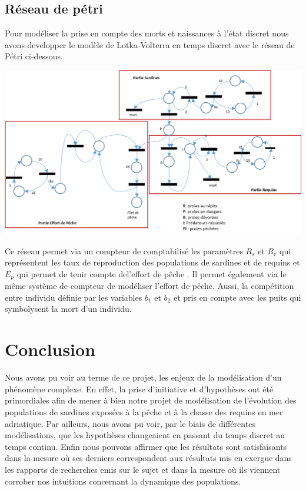 \documentclass[a4paper, 11pt]{report}%
\begin{document}
        \subsection{Réseau de pétri}
        Pour modéliser la prise en compte des morts et naissances à l'état discret nous avons developper
        le modèle de Lotka-Volterra en temps discret avec le réseau de Pétri ci-dessous. 

        \begin{center}
            \includegraphics[width=14cm]{figures/reseau_petri.png}
        \end{center}

        Ce réseau permet via un compteur de comptabilisé les paramètres $R_s$ et $R_r$  qui représentent les taux de
        reproduction des populations de sardines et de requins et $E_p$ qui permet de tenir compte del'effort de pêche . Il permet également via le même système de compteur de modéliser 
        l'effort de pêche. Aussi, la compétition entre individu définie par les variables $b_1$ et $b_2$ et pris en
        compte avec les puits qui symbolysent la mort d'un individu.
    \section{Conclusion}
    Nous avons pu voir au terme de ce projet, les enjeux de la modélisation d'un phénomène complexe. En effet, 
    la prise d'initiative et d'hypothèses ont été primordiales afin de mener à bien notre projet de modélisation 
    de l'évolution des populations de sardines exposées à la pêche et à la chasse des requins en mer adriatique. 
    Par ailleurs, nous avons pu voir, par le biais de différentes modélisations, que les hypothèses changeaient
    en passant du temps discret au temps continu. Enfin nous pouvons affirmer que les résultats sont satisfaisants
    dans la mesure où ses derniers correspondent aux résultats mis en exergue dans les rapports de recherches emis 
    sur le sujet et dans la mesure où ils viennent corrober nos intuitions concernant la dynamique des populations.
    \nocite{*}
    
\end{document}
